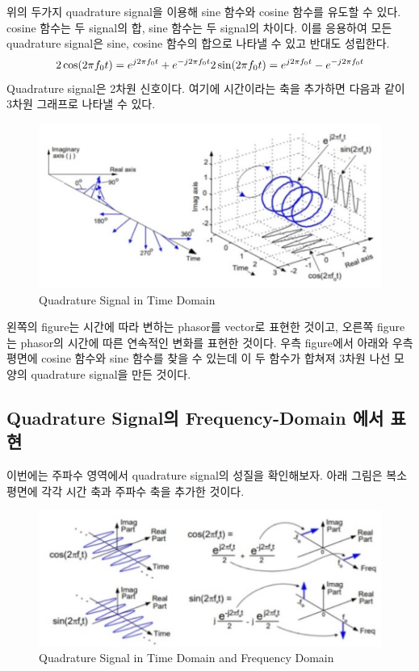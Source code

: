    위의 두가지 quadrature signal을 이용해 sine 함수와 cosine 함수를 유도할 수 있다. cosine 함수는 두 signal의 합, sine 함수는 두 signal의 차이다. 이를 응용하여 모든 quadrature signal은 sine, cosine 함수의 합으로 나타낼 수 있고 반대도 성립한다.
    \begin{equation*}
        2\cos(2\pi f_0t) = e^{j2\pi f_0 t} + e^{-j2\pi f_0 t}\\
        2\sin(2\pi f_0t) = e^{j2\pi f_0 t} - e^{-j2\pi f_0 t}
    \end{equation*}
    Quadrature signal은 2차원 신호이다. 여기에 시간이라는 축을 추가하면 다음과 같이 3차원 그래프로 나타낼 수 있다.\\
    
    \vspace{-4mm}  
    \begin{figure}[!h]\centering
		\includegraphics[width=.75\textwidth]{image/week02/2-1-2.png}
		\caption{\small Quadrature Signal in Time Domain}
		\vspace{-10pt}
    \end{figure}
    
    왼쪽의 figure는 시간에 따라 변하는 phasor를 vector로 표현한 것이고, 오른쪽 figure는 phasor의 시간에 따른 연속적인 변화를 표현한 것이다. 우측 figure에서 아래와 우측 평면에 cosine 함수와 sine 함수를 찾을 수 있는데 이 두 함수가 합쳐져 3차원 나선 모양의 quadrature signal을 만든 것이다.
    
\newpage
\subsection{Quadrature Signal의 Frequency-Domain 에서 표현}
    이번에는 주파수 영역에서 quadrature signal의 성질을 확인해보자. 아래 그림은 복소평면에 각각 시간 축과 주파수 축을 추가한 것이다.
    
    \vspace{-4mm}  
    \begin{figure}[!h]\centering
		\includegraphics[width=.75\textwidth]{image/week02/2-2-1.png}
		\caption{\small Quadrature Signal in Time Domain and Frequency Domain}
		\vspace{-10pt}
    \end{figure}
    
